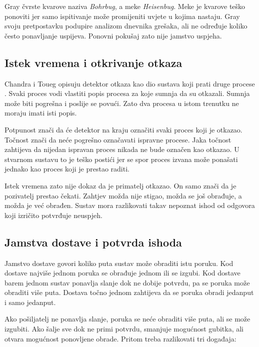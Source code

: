 Gray čvrste kvarove naziva \emph{Bohrbug}, a meke \emph{Heisenbug}. Meke je kvarove teško
ponoviti jer samo ispitivanje može promijeniti uvjete u kojima nastaju. Gray
svoju pretpostavku podupire analizom dnevnika grešaka, ali ne određuje koliko
često ponavljanje uspijeva. Ponovni pokušaj zato nije jamstvo uspjeha.

\subsection{Istek vremena i otkrivanje otkaza}
\label{sec:detekcija-otkaza}

Chandra i Toueg opisuju detektor otkaza kao dio sustava koji prati druge
procese \cite{chandra1996failuredetectors}. Svaki proces vodi vlastiti popis
procesa za koje sumnja da su otkazali. Sumnja može biti pogrešna i poslije se
povući. Zato dva procesa u istom trenutku ne moraju imati isti popis.

Potpunost znači da će detektor na kraju označiti svaki proces koji je
otkazao. Točnost znači da neće pogrešno označavati ispravne procese. Jaka
točnost zahtijeva da nijedan ispravan proces nikada ne bude označen kao
otkazao. U stvarnom sustavu to je teško postići jer se spor proces izvana
može ponašati jednako kao proces koji je prestao raditi.

Istek vremena zato nije dokaz da je primatelj otkazao. On samo znači da je
pozivatelj prestao čekati. Zahtjev možda nije stigao, možda se još obrađuje,
a možda je već obrađen. Sustav mora razlikovati takav nepoznat ishod od
odgovora koji izričito potvrđuje neuspjeh.

\subsection{Jamstva dostave i potvrda ishoda}
\label{sec:semantika-dostave}

Jamstvo dostave govori koliko puta sustav može obraditi istu poruku. Kod
dostave najviše jednom poruka se obrađuje jednom ili se izgubi. Kod dostave
barem jednom sustav ponavlja slanje dok ne dobije potvrdu, pa se poruka može
obraditi više puta. Dostava točno jednom zahtijeva da se poruka obradi jedanput
i samo jedanput.

Ako pošiljatelj ne ponavlja slanje, poruka se neće obraditi više puta, ali se
može izgubiti. Ako šalje sve dok ne primi potvrdu, smanjuje mogućnost gubitka,
ali otvara mogućnost ponovljene obrade. Pritom treba razlikovati tri događaja:


